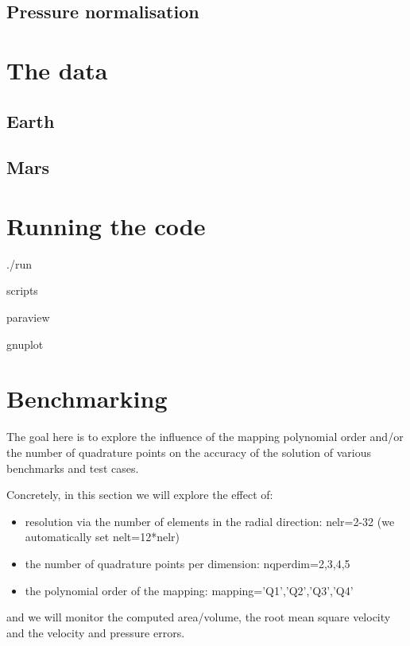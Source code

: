 \documentclass[a4paper,12pt]{article}
\newcommand{\python}{\color{teal} \sffamily }
\begin{document}
\subsection{Pressure normalisation}



\newpage
\section{The data}

\subsection{Earth}


\subsection{Mars}

\newpage
\section{Running the code}

./run

scripts

paraview

gnuplot


\newpage
\section{Benchmarking}



The goal here is to explore the influence of the mapping polynomial order and/or
the number of quadrature points on the accuracy of the solution of various benchmarks and test cases.

Concretely, in this section we will explore the effect of:
\begin{itemize}
\item resolution via the number of elements in the radial direction: {\python nelr=2-32} (we automatically set {\python nelt=12*nelr})
\item the number of quadrature points per dimension: {\python nqperdim=2,3,4,5}
\item the polynomial order of the mapping: {\python mapping='Q1','Q2','Q3','Q4'}
\end{itemize}
and we will monitor the computed area/volume, the root mean square velocity and the velocity and pressure errors.
\end{document}
